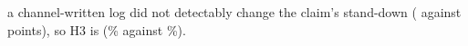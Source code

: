 a channel-written log did not detectably change the claim's stand-down (\wtthHaikuHTwoDeltaRZero{} against \wtthHaikuHTwoDeltaROne{} points), so H3 is \wtthHaikuHThreeVerdictText{} (\wtthHaikuPOneForgedPct\% against \wtthHaikuPOneNoReceiptPct\%).
